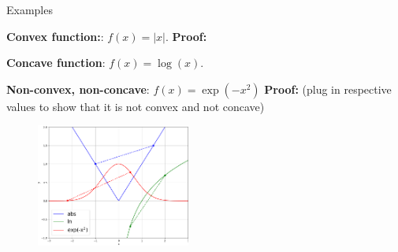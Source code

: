 \begin{vbframe}{Examples}

\textbf{Convex function:}: $f(x) = |x|$. 
\textbf{Proof: }

\lz 

\textbf{Concave function}: $f(x) = \log(x)$. 

\lz 

\textbf{Non-convex, non-concave}: $f(x) = \exp(-x^2)$
\textbf{Proof: } (plug in respective values to show that it is not convex and not concave)

\begin{figure}
    \centering
    \includegraphics[width=0.45\textwidth, right]{figure_man/conv_conc_functions.png}
\end{figure}
\end{vbframe}




